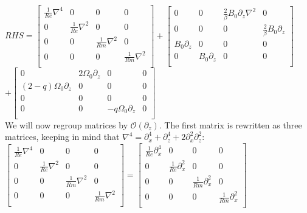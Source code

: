 \documentclass[letterpaper,12pt]{article}
\newcommand\reye{\mathrel{Re}}
\newcommand\reym{\mathrel{Rm}}
\begin{document}
$RHS = \left[\begin{matrix}
\frac{1}{\reye} \nabla^4 & 0 & 0 & 0 \\
0 & \frac{1}{\reye}\nabla^2 & 0 & 0 \\
0 & 0 & \frac{1}{\reym}\nabla^2 & 0 \\
0 & 0 & 0 & \frac{1}{\reym}\nabla^2 \\ 
\end{matrix}\right] + \left[\begin{matrix}
0 & 0 & \frac{2}{\beta}B_0 \partial_z \nabla^2 & 0 \\
0 & 0 & 0 & \frac{2}{\beta} B_0 \partial_z \\
B_0 \partial_z & 0 & 0 & 0 \\
0 & B_0 \partial_z & 0 & 0 \\ \end{matrix}\right]$ \\

$+ \left[\begin{matrix}
0 & 2 \Omega_0 \partial_z & 0 & 0 \\
\left(2 - q\right)\Omega_0\partial_z & 0 & 0 & 0 \\
0 & 0 & 0 & 0 \\
0 & 0 & -q\Omega_0\partial_z & 0 \\ \end{matrix}\right]$ \\ %

We will now regroup matrices by $\mathcal{O}(\partial_z)$. The first matrix is rewritten as three matrices, keeping in mind that $\nabla^4 = \partial_x^4 + \partial_z^4 + 2\partial_x^2\partial_z^2$: \\

$\left[\begin{matrix}
\frac{1}{\reye} \nabla^4 & 0 & 0 & 0 \\
0 & \frac{1}{\reye}\nabla^2 & 0 & 0 \\
0 & 0 & \frac{1}{\reym}\nabla^2 & 0 \\
0 & 0 & 0 & \frac{1}{\reym}\nabla^2 \\ 
\end{matrix}\right] = \left[\begin{matrix}
\frac{1}{\reye}\partial_x^4 & 0 & 0 & 0 \\
0 & \frac{1}{\reye}\partial_x^2 & 0 &0 \\
0 & 0 & \frac{1}{\reym}\partial_x^2 & 0 \\
0 & 0 & 0 & \frac{1}{\reym}\partial_x^2 \\ \end{matrix}\right] $ \\
\end{document}

